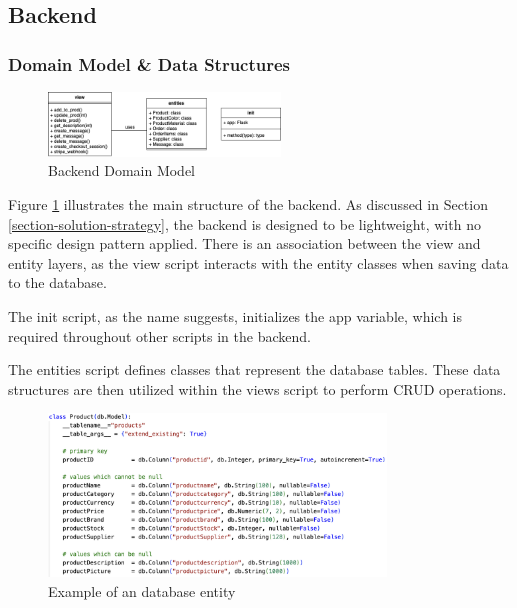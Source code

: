 \subsection{Backend}
\subsubsection{Domain Model \& Data Structures}

\begin{figure}[h]
    \centering
    \includegraphics[width=0.55\textwidth]{images/uml_backend.png}
    \caption{Backend Domain Model}
    \label{fig:doman-model-backend}
\end{figure}

Figure \ref{fig:doman-model-backend} illustrates the main structure of the backend. As discussed in Section \ref{section-solution-strategy}, the backend is designed to be lightweight, with no specific design pattern applied. There is an association between the view and entity layers, as the view script interacts with the entity classes when saving data to the database.

The init script, as the name suggests, initializes the app variable, which is required throughout other scripts in the backend.

The entities script defines classes that represent the database tables. These data structures are then utilized within the views script to perform CRUD operations.
\newpage

\begin{figure}[h]
    \centering
    \includegraphics[width=0.8\textwidth]{images/code_entity_example.png}
    \caption{Example of an database entity}
    \label{fig:db-entity}
\end{figure}

